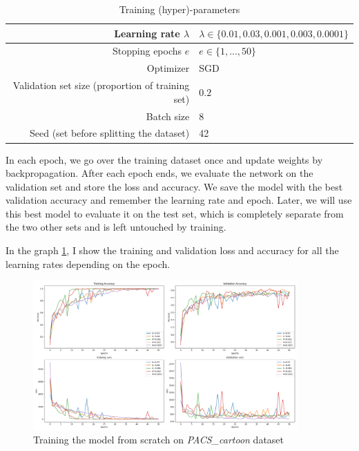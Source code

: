 \documentclass[a4paper,11pt]{article}
\begin{document}
\begin{table}[ht]
    \centering
    \begin{tabular}{ | r | l | }
        \hline
        Learning rate $\lambda$                          & $\lambda \in \{0.01, 0.03, 0.001, 0.003, 0.0001\}$ \\
        \hline
        Stopping epochs $e$                              & $e \in \{1, ..., 50\}$                             \\
        \hline
        Optimizer                                        & SGD                                                \\
        \hline
        Validation set size (proportion of training set) & $0.2$                                              \\
        \hline
        Batch size                                       & 8                                                  \\
        \hline
        Seed (set before splitting the dataset)          & 42                                                 \\
        \hline
    \end{tabular}
    \caption{Training (hyper)-parameters}
    \label{table:hyperparams}
\end{table}

In each epoch, we go over the training dataset once and update weights by backpropagation.
After each epoch ends, we evaluate the network on the validation set and store the loss and accuracy.
We save the model with the best validation accuracy and remember the learning rate and epoch.
Later, we will use this best model to evaluate it on the test set, which is completely separate from the two other sets and is left untouched by training.

In the graph \ref{fig:full_scratch}, I show the training and validation loss and accuracy for all the learning rates depending on the epoch.

\begin{figure}[ht]
    \centering
    \includegraphics[width=0.9\textwidth]{../out/single_shot_full_model.png}
    \caption{Training the model from scratch on \textit{PACS\_cartoon} dataset}
    \label{fig:full_scratch}
\end{figure}
\end{document}
